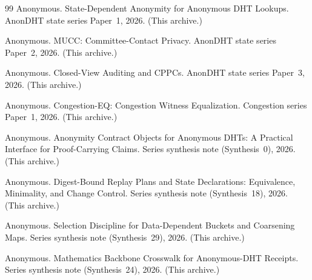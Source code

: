 \documentclass[11pt]{article}
\begin{document}
\begin{thebibliography}{99}
Anonymous.
\newblock State-Dependent Anonymity for Anonymous DHT Lookups.
\newblock AnonDHT state series Paper~1, 2026. (This archive.)

Anonymous.
\newblock MUCC: Committee-Contact Privacy.
\newblock AnonDHT state series Paper~2, 2026. (This archive.)

Anonymous.
\newblock Closed-View Auditing and CPPCs.
\newblock AnonDHT state series Paper~3, 2026. (This archive.)

Anonymous.
\newblock Congestion-EQ: Congestion Witness Equalization.
\newblock Congestion series Paper~1, 2026. (This archive.)


Anonymous.
\newblock Anonymity Contract Objects for Anonymous DHTs: A Practical Interface for Proof-Carrying Claims.
\newblock Series synthesis note (Synthesis~0), 2026. (This archive.)


Anonymous.
\newblock Digest-Bound Replay Plans and State Declarations: Equivalence, Minimality, and Change Control.
\newblock Series synthesis note (Synthesis~18), 2026. (This archive.)


Anonymous.
\newblock Selection Discipline for Data-Dependent Buckets and Coarsening Maps.
\newblock Series synthesis note (Synthesis~29), 2026. (This archive.)


Anonymous.
\newblock Mathematics Backbone Crosswalk for Anonymous-DHT Receipts.
\newblock Series synthesis note (Synthesis~24), 2026. (This archive.)

\end{thebibliography}
\end{document}
